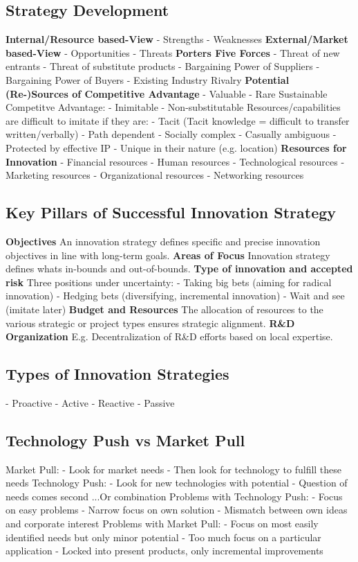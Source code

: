 \documentclass{scrartcl}
\begin{document}
\subsection*{Strategy Development}
\textbf{Internal/Resource based-View}
- Strengths
- Weaknesses
\textbf{External/Market based-View}
- Opportunities
- Threats
\textbf{Porters Five Forces}
- Threat of new entrants
- Threat of substitute products
- Bargaining Power of Suppliers
- Bargaining Power of Buyers
- Existing Industry Rivalry
\textbf{Potential (Re-)Sources of Competitive Advantage}
- Valuable
- Rare
Sustainable Competitve Advantage:
- Inimitable
- Non-substitutable
Resources/capabilities are difficult to imitate if they are:
- Tacit (Tacit knowledge = difficult to transfer written/verbally)
- Path dependent
- Socially complex
- Casually ambiguous
- Protected by effective IP
- Unique in their nature (e.g. location)
\textbf{Resources for Innovation}
- Financial resources
- Human resources
- Technological resources
- Marketing resources
- Organizational resources
- Networking resources
\subsection*{Key Pillars of Successful Innovation Strategy}
\textbf{Objectives}
An innovation strategy defines specific and precise innovation objectives in line with long-term goals.
\textbf{Areas of Focus}
Innovation strategy defines whats in-bounds and out-of-bounds.
\textbf{Type of innovation and accepted risk}
Three positions under uncertainty:
- Taking big bets (aiming for radical innovation)
- Hedging bets (diversifying, incremental innovation)
- Wait and see (imitate later)
\textbf{Budget and Resources}
The allocation of resources to the various strategic or project types ensures strategic alignment.
\textbf{R\&D Organization}
E.g. Decentralization of R\&D efforts based on local expertise.
\subsection*{Types of Innovation Strategies}
- Proactive
- Active
- Reactive
- Passive
\subsection*{Technology Push vs Market Pull}
Market Pull:
- Look for market needs
- Then look for technology to fulfill these needs
Technology Push:
- Look for new technologies with potential
- Question of needs comes second
...Or combination
Problems with Technology Push:
- Focus on easy problems
- Narrow focus on own solution
- Mismatch between own ideas and corporate interest
Problems with Market Pull:
- Focus on most easily identified needs but only minor potential
- Too much focus on a particular application
- Locked into present products, only incremental improvements
\end{document}

